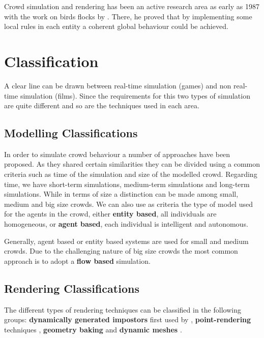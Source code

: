 \documentclass[11pt,twocolumn]{article}
\numberwithin{equation}{section} %
\numberwithin{figure}{section} %
\numberwithin{table}{section} %
\begin{document}
Crowd simulation and rendering has been an active research area as early as 1987 with the work on birds flocks by \cite{Reynolds1987}.
There, he proved that by implementing some local rules in each entity a coherent global behaviour could be achieved.

\section{Classification}

A clear line can be drawn between real-time simulation (games) and non real-time simulation (films).
Since the requirements for this two types of simulation are quite different and so are the techniques used in each area.

\subsection{Modelling Classifications}

In order to simulate crowd behaviour a number of approaches have been proposed.
As they shared certain similarities they can be divided using a common criteria such as time of the simulation and size of the modelled crowd.
Regarding time, we have short-term simulations, medium-term simulations and long-term simulations.
While in terms of size a distinction can be made among small, medium and big size crowds.
We can also use as criteria the type of model used for the agents in the crowd, either \textbf{entity based}, all individuals are homogeneous, or \textbf{agent based}, each individual is intelligent and autonomous.

Generally, agent based or entity based systems are used for small and medium crowds.
Due to the challenging nature of big size crowds the most common approach is to adopt a \textbf{flow based} simulation.

\subsection{Rendering Classifications}

The different types of rendering techniques can be classified in the following groups: \textbf{dynamically generated impostors} first used by  \cite{Aubel2000}, \textbf{point-rendering} techniques \cite{Wand2002}, \textbf{geometry baking} \cite{Ulicny2004} and \textbf{dynamic meshes} \cite{Ciechomski2005}.

%
\end{document}
